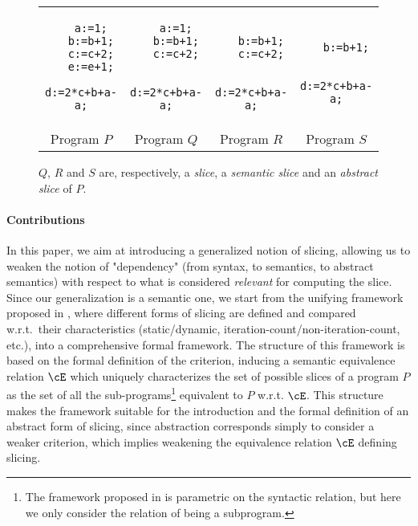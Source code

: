 \documentclass[prodmode,acmtocl]{acmsmall}
\def\prog{\ensuremath{P}\xspace}
\def\progq{\ensuremath{Q}\xspace}
\def\progr{\ensuremath{R}\xspace}
\def\progss{\ensuremath{S}\xspace}
\newcommand{\0}{\mbox{\bf 0}}
\begin{document}
\begin{figure}
  \begin{center}
    \begin{tabular}{cccc}
      \begin{lstlisting}
   a:=1;
   b:=b+1;
   c:=c+2;
   e:=e+1;
   d:=2*c+b+a-a;
      \end{lstlisting}
      &
      \begin{lstlisting}
   a:=1;
   b:=b+1;
   c:=c+2;
   
   d:=2*c+b+a-a;
      \end{lstlisting}
      &
      \begin{lstlisting}
  
   b:=b+1;
   c:=c+2;
   
   d:=2*c+b+a-a;
      \end{lstlisting}
      &
      \begin{lstlisting}
   
   b:=b+1;
   
   d:=2*c+b+a-a;
      \end{lstlisting} \\[8mm]
      Program \prog & Program \progq & Program \progr &Program \progss
    \end{tabular}
  \end{center}
  \caption{$\progq$, $\progr$ and $\progss$ are, respectively, a
    \emph{slice}, a \emph{semantic slice} and an \emph{abstract
      slice} of $\prog$.\label{fig:ProgP33}}
\end{figure}

\paragraph{Contributions}

In this paper, we aim at introducing a generalized notion of slicing,
allowing us to weaken the notion of "dependency" (from syntax, to
semantics, to abstract semantics) with respect to what is considered
\emph{relevant} for computing the slice.  Since our generalization is
a semantic one, we start from the unifying framework proposed in
\cite{AForm,TheoFoun}, where different forms of slicing are defined
and compared w.r.t.~their characteristics (static/dynamic,
iteration-count/non-iteration-count, etc.), into a comprehensive
formal framework.  The structure of this framework is based on the
formal definition of the criterion, inducing a semantic equivalence
relation $\cE$ which uniquely characterizes the set of possible slices
of a program $\prog$ as the set of all the sub-programs\footnote{The
  framework proposed in \cite{AForm,TheoFoun} is parametric on the
  syntactic relation, but here we only consider the relation of being
  a subprogram.} equivalent to $\prog$ w.r.t. $\cE$.  This structure
makes the framework suitable for the introduction and the formal
definition of an abstract form of slicing, since abstraction
corresponds simply to consider a weaker criterion, which implies
weakening the equivalence relation $\cE$ defining slicing.
\end{document}
